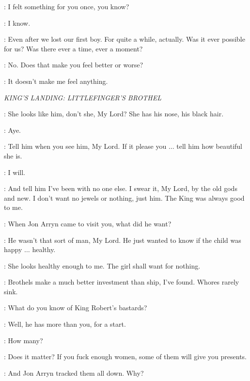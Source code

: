 \CERSEI: I felt something for you once, you know? 

\ROBERT: I know. 

\CERSEI: Even after we lost our first boy. For quite a while, actually. Was it ever possible for us? Was there ever a time, ever a moment? 

\ROBERT: No. Does that make you feel better or worse? 

\CERSEI: It doesn't make me feel anything. 


\scene

\textit{KING'S LANDING: LITTLEFINGER'S BROTHEL} 


\MHAEGEN: She looks like him, don't she, My Lord? She has his nose, his black hair. 

\NED: Aye. 

\MHAEGEN: Tell him when you see him, My Lord. If it please you $\ldots$ tell him how beautiful she is. 

\NED: I will. 

\MHAEGEN: And tell him I've been with no one else. I swear it, My Lord, by the old gods and new. I don't want no jewels or nothing, just him. The King was always good to me. 

\NED: When Jon Arryn came to visit you, what did he want? 

\MHAEGEN: He wasn't that sort of man, My Lord. He just wanted to know if the child was happy $\ldots$ healthy. 

\NED: She looks healthy enough to me. The girl shall want for nothing. 


\LITTLEFINGER: Brothels make a much better investment than ship, I've found. Whores rarely sink. 

\NED: What do you know of King Robert's bastards? 

\LITTLEFINGER: Well, he has more than you, for a start. 

\NED: How many? 

\LITTLEFINGER: Does it matter? If you fuck enough women, some of them will give you presents. 

\NED: And Jon Arryn tracked them all down. Why? 

